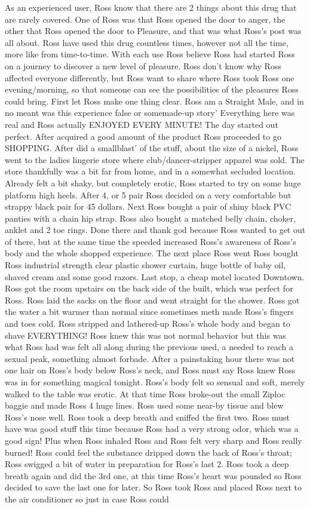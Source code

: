 \documentclass[12pt]{book}
\begin{document}
As an experienced user, Ross know that there are 2 things about this drug that are rarely covered. One of Ross was that Ross opened the door to anger, the other that Ross opened the door to Pleasure, and that was what Ross's post was all about. Ross have used this drug countless times, however not all the time, more like from time-to-time. With each use Ross believe Ross had started Ross on a journey to discover a new level of pleasure. Ross don't know why Ross affected everyone differently, but Ross want to share where Ross took Ross one evening/morning, so that someone can see the possibilities of the pleasures Ross could bring. First let Ross make one thing clear. Ross am a Straight Male, and in no meant was this experience false or somemade-up story' Everything here was real and Ross actually ENJOYED EVERY MINUTE! The day started out perfect. After acquired a good amount of the product Ross proceeded to go SHOPPING. After did a smallblast' of the stuff, about the size of a nickel, Ross went to the ladies lingerie store where club/dancer-stripper apparel was sold. The store thankfully was a bit far from home, and in a somewhat secluded location. Already felt a bit shaky, but completely erotic, Ross started to try on some huge platform high heels. After 4, or 5 pair Ross decided on a very comfortable but strappy black pair for 45 dollars. Next Ross bought a pair of shiny black PVC panties with a chain hip strap. Ross also bought a matched belly chain, choker, anklet and 2 toe rings. Done there and thank god because Ross wanted to get out of there, but at the same time the speeded increased Ross's awareness of Ross's body and the whole shopped experience. The next place Ross went Ross bought Ross industrial strength clear plastic shower curtain, huge bottle of baby oil, shaved cream and some good razors. Last stop, a cheap motel located Downtown. Ross got the room upstairs on the back side of the built, which was perfect for Ross. Ross laid the sacks on the floor and went straight for the shower. Ross got the water a bit warmer than normal since sometimes meth made Ross's fingers and toes cold. Ross stripped and lathered-up Ross's whole body and began to shave EVERYTHING! Ross knew this was not normal behavior but this was what Ross had was felt all along during the previous used, a needed to reach a sexual peak, something almost forbade. After a painstaking hour there was not one hair on Ross's body below Ross's neck, and Ross must say Ross knew Ross was in for something magical tonight. Ross's body felt so sensual and soft, merely walked to the table was erotic. At that time Ross broke-out the small Ziploc baggie and made Ross 4 huge lines. Ross used some near-by tissue and blew Ross's nose well. Ross took a deep breath and sniffed the first two. Ross must have was good stuff this time because Ross had a very strong odor, which was a good sign! Plus when Ross inhaled Ross and Ross felt very sharp and Ross really burned! Ross could feel the substance dripped down the back of Ross's throat; Ross swigged a bit of water in preparation for Ross's last 2. Ross took a deep breath again and did the 3rd one, at this time Ross's heart was pounded so Ross decided to save the last one for later. So Ross took Ross and placed Ross next to the air conditioner so just in case Ross could 
\end{document}
